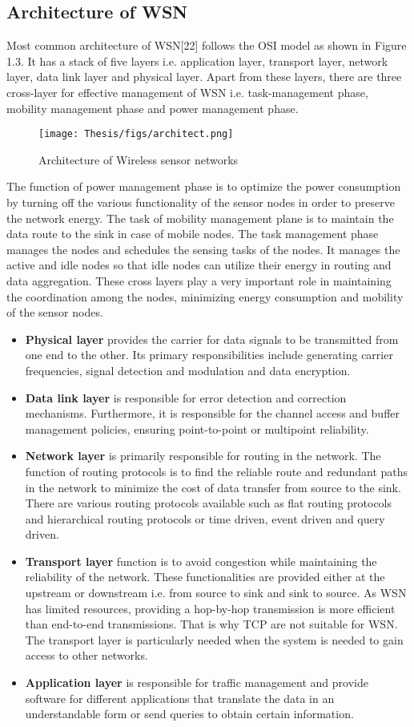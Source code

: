 \subsection{Architecture of WSN}
Most common architecture of WSN[22] follows the OSI model as shown in Figure 1.3. It has a stack of five layers i.e. application layer, transport layer, network layer, data link layer and physical layer. Apart from these layers, there are three cross-layer for effective management of WSN i.e. task-management phase, mobility management phase and power management phase. 
\begin{figure}[h!]
    \centering
    \texttt{[image: Thesis/figs/architect.png]}
    \caption{Architecture of Wireless sensor networks}
    \label{fig:my_label}
\end{figure}
The function of power management phase is to optimize the power consumption by turning off the various functionality of the sensor nodes in order to preserve the network energy. The task of mobility management plane is to maintain the data route to the sink in case of mobile nodes. The task management phase manages the nodes and schedules the sensing tasks of the nodes. It manages the active and idle nodes so that idle nodes can utilize their energy in routing and data aggregation. These cross layers play a very important role in  maintaining the coordination among the nodes, minimizing energy consumption and mobility of the sensor nodes.
\begin{itemize}
    \item \textbf{Physical layer} provides the carrier for data signals to be transmitted from one end to the other. Its primary responsibilities include generating carrier frequencies, signal detection and modulation and data encryption. 
    \item \textbf{Data link layer} is responsible for error detection and correction mechanisms. Furthermore, it is responsible for the channel access and buffer management policies, ensuring point-to-point or multipoint reliability. 
    \item \textbf{Network layer} is primarily responsible for routing in the network. The function of routing protocols is to find the reliable route and redundant paths in the network to minimize the cost of data transfer from source to the sink. There are various routing protocols available such as flat routing protocols and hierarchical routing protocols or time driven, event driven and query driven. 
    \item \textbf{Transport layer} function is to avoid congestion while maintaining the reliability of the network. These functionalities are provided either at the upstream or downstream i.e. from source to sink and sink to source. As WSN has limited resources, providing a hop-by-hop transmission is more efficient than end-to-end transmissions. That is why TCP are not suitable for WSN. The transport layer is particularly needed when the system is needed to gain access to other networks.
    \item \textbf{Application layer} is responsible for traffic management and provide software for different applications that translate the data in an understandable form or send queries to obtain certain information.  
\end{itemize}
